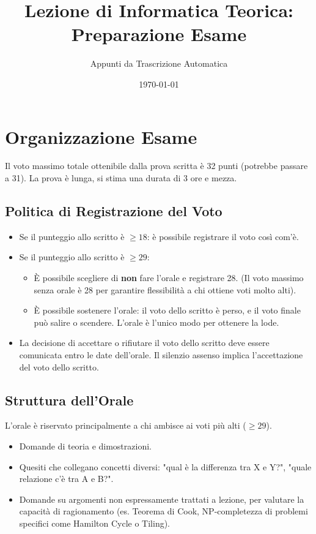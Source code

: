 \documentclass[a4paper]{article}
\title{Lezione di Informatica Teorica: Preparazione Esame}
\author{Appunti da Trascrizione Automatica}
\date{\today}
\theoremstyle{definition} %
\begin{document}
\maketitle
\tableofcontents
\newpage

\section{Organizzazione Esame}
Il voto massimo totale ottenibile dalla prova scritta è 32 punti (potrebbe passare a 31).
La prova è lunga, si stima una durata di 3 ore e mezza.

\subsection{Politica di Registrazione del Voto}
\begin{itemize}
    \item Se il punteggio allo scritto è $\geq 18$: è possibile registrare il voto così com'è.
    \item Se il punteggio allo scritto è $\geq 29$:
    \begin{itemize}
        \item È possibile scegliere di \textbf{non} fare l'orale e registrare 28. (Il voto massimo senza orale è 28 per garantire flessibilità a chi ottiene voti molto alti).
        \item È possibile sostenere l'orale: il voto dello scritto è perso, e il voto finale può salire o scendere. L'orale è l'unico modo per ottenere la lode.
    \end{itemize}
    \item La decisione di accettare o rifiutare il voto dello scritto deve essere comunicata entro le date dell'orale. Il silenzio assenso implica l'accettazione del voto dello scritto.
\end{itemize}

\subsection{Struttura dell'Orale}
L'orale è riservato principalmente a chi ambisce ai voti più alti ($\geq 29$).
\begin{itemize}
    \item Domande di teoria e dimostrazioni.
    \item Quesiti che collegano concetti diversi: "qual è la differenza tra X e Y?", "quale relazione c'è tra A e B?".
    \item Domande su argomenti non espressamente trattati a lezione, per valutare la capacità di ragionamento (es. Teorema di Cook, NP-completezza di problemi specifici come Hamilton Cycle o Tiling).
\end{itemize}
\end{document}
